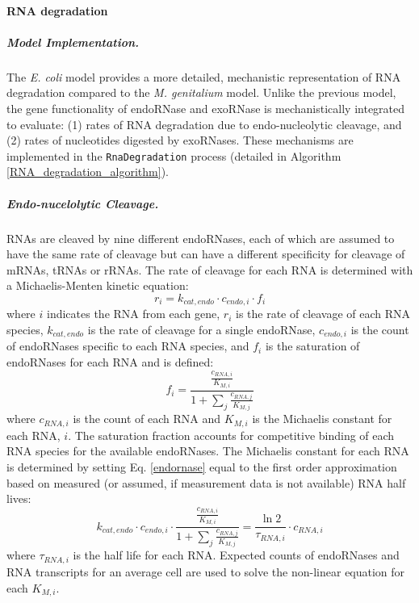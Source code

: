\documentclass[12pt]{article}
\begin{document}
\baselineskip24pt

\paragraph{RNA degradation}
\label{sec:rna-deg}

\subparagraph{Model Implementation.}
The \emph{E. coli} model provides a more detailed, mechanistic representation of RNA degradation compared to the \emph{M. genitalium} model. Unlike the previous model, the gene functionality of endoRNase and exoRNase is mechanistically integrated to evaluate: (1) rates of RNA degradation due to endo-nucleolytic cleavage, and (2) rates of nucleotides digested by exoRNases.  These mechanisms are implemented in the \texttt{RnaDegradation} process (detailed in Algorithm \ref{RNA_degradation_algorithm}).

\subparagraph{Endo-nucelolytic Cleavage.}
RNAs are cleaved by nine different endoRNases, each of which are assumed to have the same rate of cleavage but can have a different specificity for cleavage of mRNAs, tRNAs or rRNAs. The rate of cleavage for each RNA is determined with a Michaelis-Menten kinetic equation:
\begin{equation}
\label{endornase}
    r_i = k_{cat,endo} \cdot c_{endo,i} \cdot f_i
\end{equation}
\noindent where $i$ indicates the RNA from each gene, $r_i$ is the rate of cleavage of each RNA species, $k_{cat,endo}$ is the rate of cleavage for a single endoRNase, $c_{endo,i}$ is the count of endoRNases specific to each RNA species, and $f_i$ is the saturation of endoRNases for each RNA and is defined:
\begin{equation}
    f_i = \frac{\frac{c_{RNA,i}}{K_{M,i}}}{1 + \sum\limits_j \frac{c_{RNA,j}}{K_{M,j}}}
\end{equation}
\noindent where $c_{RNA,i}$ is the count of each RNA and $K_{M,i}$ is the Michaelis constant for each RNA, $i$.  The saturation fraction accounts for competitive binding of each RNA species for the available endoRNases.  The Michaelis constant for each RNA is determined by setting Eq. \ref{endornase} equal to the first order approximation based on measured (or assumed, if measurement data is not available) RNA half lives:
\begin{equation}
    k_{cat,endo} \cdot c_{endo,i} \cdot \frac{\frac{c_{RNA,i}}{K_{M,i}}}{1 + \sum\limits_j \frac{c_{RNA,j}}{K_{M,j}}} = \frac{\ln 2}{\tau_{RNA,i}} \cdot c_{RNA,i}
\end{equation}
\noindent where $\tau_{RNA,i}$ is the half life for each RNA.  Expected counts of endoRNases and RNA transcripts for an average cell are used to solve the non-linear equation for each $K_{M,i}$.
\end{document}
